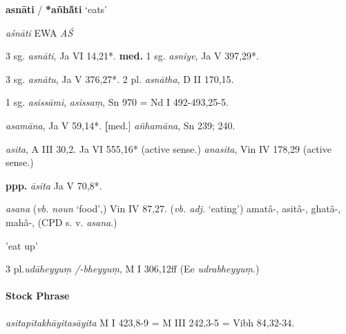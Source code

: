 \documentclass[11pt]{article}
\newcommand*\ṛ{r\symbol{"325}}
\newcommand*\Ṛ{R\symbol{"325}}
\newcommand*\ṝ{r\symbol{"304}\symbol{"325}}
\newcommand*\Ṝ{R\symbol{"304}\symbol{"325}}
\newcommand*\ḷ{l\symbol{"325}}
\newcommand*\ḹ{l\symbol{"304}\symbol{"325}}
\newcommand*\Ḷ{L\symbol{"325}}
\newcommand*\Ḹ{L\symbol{"304}\symbol{"325}}
\begin{document}
%
%
\begin{center}
{\Large
\textbf{asnāti} / \textbf{*añh{\={\v{a}ti}}} `eats'
}
\end{center}
\begin{description}[leftmargin=\parindent]
\item[ety.]
\textit{aśnāti}
EWA \textit{AŚ}
\end{description}
\begin{description}[leftmargin=\parindent]
\item[pres.] 3 sg. \textit{asnāti}, Ja VI 14,21*.
\textbf{med.} 1 sg. \textit{asniye}, Ja V 397,29*.
\item[imp.] 3 sg. \textit{asnātu}, Ja V 376,27*.
2 pl. \textit{asnātha}, D II 170,15.%
\item[fut.] 1 sg. \textit{asissāmi}, \textit{asissaṃ}, Sn 970 = Nd I 492-493,25-5.
\item[pres. part.] \textit{asamāna}, Ja V 59,14*. \textbf[med.] \textit{añhamāna}, Sn 239; 240. 
\item[ppp.] \textit{asita}, A III 30,2. Ja VI 555,16* (active sense.) \textit{anasita}, Vin IV 178,29 (active sense.)\\
\item[caus.] \textbf{ppp.} \textit{āsita} Ja V 70,8*.
\end{description}

\begin{description}[leftmargin=\parindent]
\item[deriv.]
\textit{asana} (\textit{vb. noun} `food',) Vin IV 87,27.
(\textit{vb. adj.} `eating') amatâ-, asitâ-, ghatâ-, mahâ-, (CPD s. v. \textit{asana}.)
\end{description}

\begin{description}[leftmargin=\parindent]
\item[ud] 'eat up'
\item[opt.] 3 pl.\textit{udāheyyuṃ /-bheyyuṃ}, M I 306,12ff (Ee \textit{udrabheyyuṃ}.)
\end{description}

\paragraph*{Stock Phrase}
\textit{asitapītakhāyitasāyita} M I 423,8-9 = M III 242,3-5 = Vibh 84,32-34. 
\end{document}
